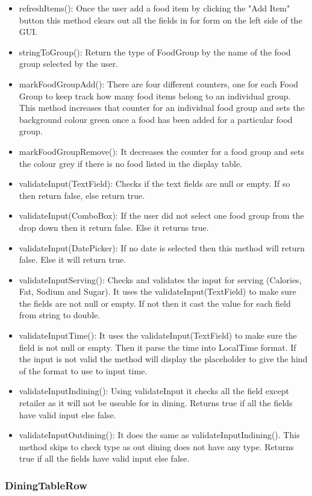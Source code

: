 \documentclass{scrreprt}
\begin{document}
\begin{itemize}
	\item refreshItems(): Once the user add a food item by clicking the "Add Item" button this method clears out all the fields in for form on the left side of the GUI.
	\item stringToGroup(): Return the type of FoodGroup by the name of the food group selected by the user.
	\item markFoodGroupAdd(): There are four different counters, one for each Food Group to keep track how many food items belong to an individual group. This method increases that counter for an individual food group and sets the background colour green 				once a food has been added for a particular food group.
	\item markFoodGroupRemove(): It decreases the counter for a food group and sets the colour grey if there is no food listed in the display table.
	\item validateInput(TextField): Checks if the text fields are null or empty. If so then return false, else return true.
	\item validateInput(ComboBox): If the user did not select one food group from the drop down then it return false. Else it returns true.
	\item validateInput(DatePicker): If no date is selected then this method will return false. Else it will return true.
	\item validateInputServing(): Checks and validates the input for serving (Calories, Fat, Sodium and Sugar). It uses the validateInput(TextField) to make sure the fields are not null or empty. If not then it cast the value for each field from string to double.
	\item validateInputTime(): It uses the validateInput(TextField) to make sure the field is not null or empty. Then it parse the time into LocalTime format. If the input is not valid the method will display the placeholder to give the hind of the format to use to input time.
	\item validateInputIndining(): Using validateInput it checks all the field except retailer as it will not be useable for in dining. Returns true if all the fields have valid input else false.
	\item validateInputOutdining(): It does the same as validateInputIndining(). This method skips to check type as out dining does not have any type. Returns true if all the fields have valid input else false.
\end{itemize}

\subsubsection{DiningTableRow}
\end{document}
